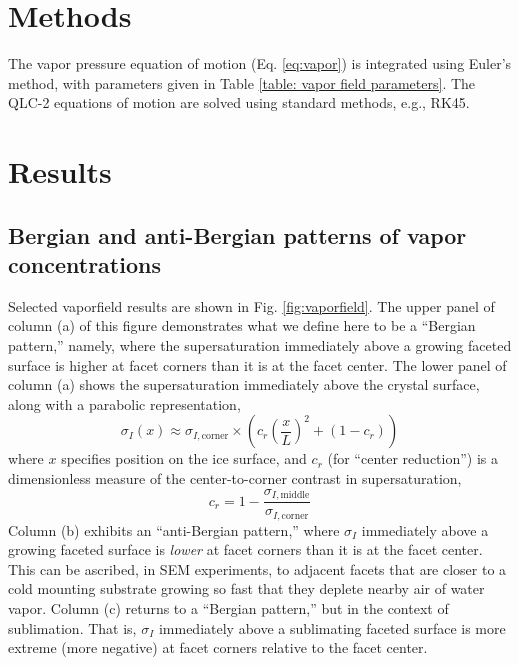 \documentclass[draft]{agujournal2019}
\begin{document}
\section{Methods}
The vapor pressure equation of motion (Eq. \ref{eq:vapor}) is integrated using Euler’s method, with parameters given in Table \ref{table: vapor field parameters}. The QLC-2 equations of motion are solved using standard methods, e.g., RK45. 

\section{Results}
\label{sec:Results}

\subsection{Bergian and anti-Bergian patterns of vapor concentrations}
\label{subsection:Bergian and anti-Bergian}
Selected vaporfield results are shown in Fig. \ref{fig:vaporfield}. The upper panel of column (a) of this figure demonstrates what we define here to be a ``Bergian pattern,'' namely, where the supersaturation immediately above a growing faceted surface is higher at facet corners than it is at the facet center. The lower panel of column (a) shows the supersaturation immediately above the crystal surface, along with a parabolic representation,
\begin{equation}
    \sigma_I(x) \approx \sigma_{I,\text{corner}}\times \left(c_r\left(\frac{x}{L}\right)^2+(1-c_r)\right)
\end{equation}
where $x$ specifies position on the ice surface, and $c_r$ (for ``center reduction'') is a dimensionless measure of the center-to-corner contrast in supersaturation, 
\begin{equation}
    c_r = 1-\frac{\sigma_{I,\text{middle}}}{\sigma_{I,\text{corner}}}
    \label{eq:center_reduction}
\end{equation}
Column (b) exhibits an ``anti-Bergian  pattern,'' where $\sigma_I$ immediately above a growing faceted surface is \textit{lower} at facet corners than it is at the facet center. This can be ascribed, in SEM experiments, to adjacent facets that are closer to a cold mounting substrate growing so fast that they deplete nearby air of water vapor. Column (c) returns to a ``Bergian pattern,'' but in the context of sublimation. That is, $\sigma_I$ immediately above a sublimating faceted surface is more extreme (more negative) at facet corners relative to the facet center. 
\end{document}
